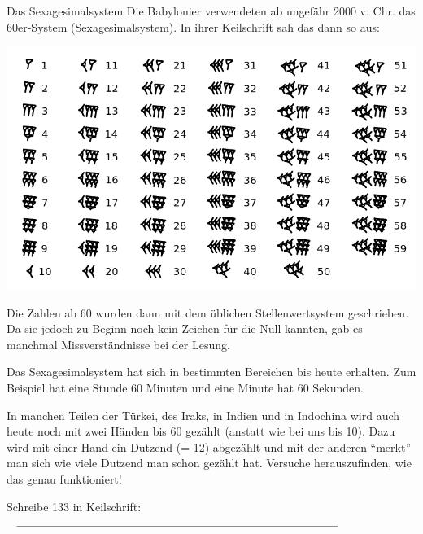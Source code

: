 \documentclass{../../../zirkelblatt}
\begin{document}
\pagebreak

\begin{aufgabe}{Das Sexagesimalsystem}
Die Babylonier verwendeten ab ungefähr 2000 v. Chr. das 60er-System
(Sexagesimalsystem). In ihrer Keilschrift sah das dann so aus:
\begin{center}
\includegraphics[scale=0.5]{60er-System}
\end{center}

Die Zahlen ab 60 wurden dann mit dem üblichen Stellenwertsystem geschrieben. Da
sie jedoch zu Beginn noch kein Zeichen für die Null kannten, gab es manchmal
Missverständnisse bei der Lesung.

Das Sexagesimalsystem hat sich in bestimmten Bereichen bis heute erhalten. Zum
Beispiel hat eine Stunde 60 Minuten und eine Minute hat 60 Sekunden.

In manchen Teilen der Türkei, des Iraks, in Indien und in Indochina wird auch
heute noch mit zwei Händen bis 60 gezählt (anstatt wie bei uns bis 10). Dazu
wird mit einer Hand ein Dutzend (= 12) abgezählt und mit der anderen "`merkt"'
man sich wie viele Dutzend man schon gezählt hat. Versuche herauszufinden, wie
das genau funktioniert!

Schreibe 133 in Keilschrift: $\rule{10.5cm}{0.5px}$
\end{aufgabe}
\end{document}
